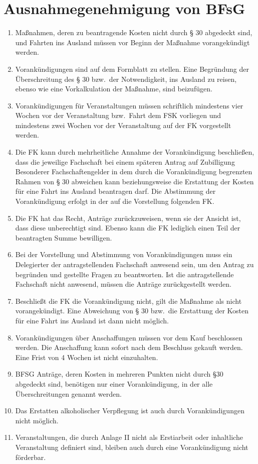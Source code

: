 \documentclass{article}
\begin{document}
\section{Ausnahmegenehmigung von BFsG}
\begin{enumerate}[(1)]
    \item Maßnahmen, deren zu beantragende Kosten nicht durch § 30 abgedeckt sind, und Fahrten ins Ausland müssen vor Beginn der Maßnahme vorangekündigt werden.
    \item Vorankündigungen sind auf dem Formblatt zu stellen. 
    	Eine Begründung der Überschreitung des § 30 bzw.\ der Notwendigkeit, ins Ausland zu reisen, ebenso wie eine Vorkalkulation der Maßnahme, sind beizufügen.
    \item Vorankündigungen für Veranstaltungen müssen schriftlich mindestens vier Wochen vor der Veranstaltung bzw.\ Fahrt dem FSK vorliegen und mindestens zwei Wochen vor der Veranstaltung auf der FK vorgestellt werden.
    \item Die FK kann durch mehrheitliche Annahme der Vorankündigung beschließen, dass die jeweilige Fachschaft bei einem späteren Antrag auf Zubilligung Besonderer Fachschaftengelder in dem durch die Vorankündigung begrenzten Rahmen von § 30 abweichen kann beziehungsweise die Erstattung der Kosten für eine Fahrt ins Ausland beantragen darf. 
    	Die Abstimmung der Vorankündigung erfolgt in der auf die Vorstellung folgenden FK.
    \item Die FK hat das Recht, Anträge zurückzuweisen, wenn sie der Ansicht ist, dass diese unberechtigt sind. 
    	Ebenso kann die FK lediglich einen Teil der beantragten Summe bewilligen.
    \item Bei der Vorstellung und Abstimmung von Vorankündigungen muss ein Delegierter der antragstellenden Fachschaft anwesend sein, um den Antrag zu begründen und gestellte Fragen zu beantworten. 
    	Ist die antragstellende Fachschaft nicht anwesend, müssen die Anträge zurückgestellt werden.
    \item Beschließt die FK die Vorankündigung nicht, gilt die Maßnahme als nicht vorangekündigt. 
    	Eine Abweichung von § 30 bzw.\ die Erstattung der Kosten für eine Fahrt ins Ausland ist dann nicht möglich.
    \item Vorankündigungen über Anschaffungen müssen vor dem Kauf beschlossen werden. 
    	Die Anschaffung kann sofort nach dem Beschluss gekauft werden. 
    	Eine Frist von 4 Wochen ist nicht einzuhalten.
    \item BFSG Anträge, deren Kosten in mehreren Punkten nicht durch §30 abgedeckt sind, benötigen nur einer Vorankündigung, in der alle Überschreitungen genannt werden.
    \item Das Erstatten alkoholischer Verpflegung ist auch durch Vorankündigungen nicht möglich.
    \item Veranstaltungen, die durch Anlage II nicht als Erstiarbeit oder inhaltliche Veranstaltung definiert sind,  bleiben auch durch eine Vorankündigung nicht förderbar.
    
\end{enumerate}
 
\end{document}
